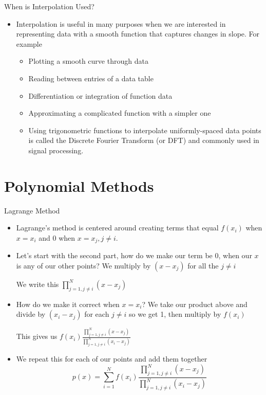 {}\documentclass[letterpaper,
compress,
xcolor=x11names,
]{beamer}
\begin{document}

\begin{frame}{When is Interpolation Used?}
	\footnotesize
	\begin{itemize}
		\item Interpolation is useful in many purposes when we are interested in representing data with a smooth function that captures changes in slope. For example
		\begin{itemize}
			\item Plotting a smooth curve through data
			\item Reading between entries of a data table
			\item Differentiation or integration of function data
			\item Approximating a complicated function with a simpler one
			\item Using trigonometric functions to interpolate uniformly-spaced data points is called the Discrete Fourier Transform (or DFT) and commonly used in signal processing.
		\end{itemize}
	\end{itemize}
\end{frame}

\section{Polynomial Methods}

\begin{frame}{Lagrange Method}
	\footnotesize
	\begin{itemize}
		\item Lagrange's method is centered around creating terms that equal $f(x_i)$ when $x=x_i$ and 0 when $x=x_j, j\neq i$.
		\item Let's start with the second part, how do we make our term be 0, when our $x$ is any of our other points? We multiply by $(x-x_j)$ for all the $j\neq i$ 
		\begin{center}
			We write this $\displaystyle\prod_{j=1, j\neq i}^{N}(x-x_j)$
		\end{center}
		\item How do we make it correct when $x=x_i$? We take our product above and divide by $(x_i-x_j)$ for each $j\neq i$ so we get 1, then multiply by $f(x_i)$
		\begin{center}
			This gives us  $\displaystyle f(x_i)\frac{\prod_{j=1, j\neq i}^{N}(x-x_j)}{\prod_{j=1, j\neq i}^{N}(x_i-x_j)}$
		\end{center}
		\item We repeat this for each of our points and add them together
		\begin{equation*}
			p(x) = \sum_{i=1}^{N}f(x_i)\frac{\prod_{j=1, j\neq i}^{N}(x-x_j)}{\prod_{j=1, j\neq i}^{N}(x_i-x_j)}
		\end{equation*}
	\end{itemize}
\end{frame}
\end{document}
